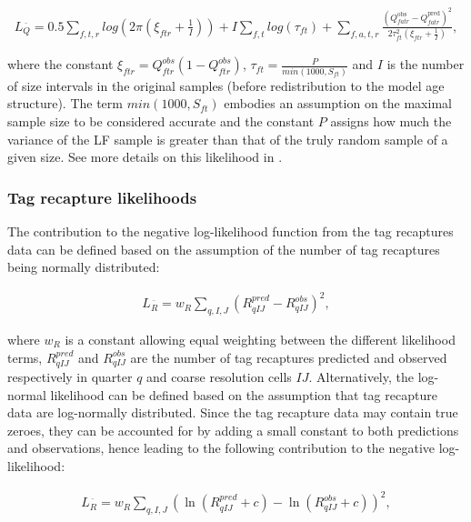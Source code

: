 \begin{align}\label{eq:lf-like2}
L_{\scriptscriptstyle  Q}^{\bar{\text{ }}} = 0.5\sum\limits_{f,t,r} log\left(2 \pi \left(\xi_{ftr}+\frac{1}{I}\right)\right)+		I\sum\limits_{f,t} log(\tau_{ft}) + \sum\limits_{f,a,t,r} \frac{\left(Q^{\text{obs}}_{fatr}-Q^{\text{pred}}_{fatr}\right)^2}{2\tau^2_{ft} \left(\xi_{ftr}+\frac{1}{I}\right)},
\end{align}

\noindent where the constant $\xi_{ftr}=Q^{obs}_{ftr}(1-Q^{obs}_{ftr})$, $\tau_{ft}=\frac{P}{min(1000,S_{ft})}$ and $I$ is the number of size intervals in the original samples (before redistribution to the model age structure). The term $min(1000,S_{ft})$ embodies an assumption on the maximal sample size to be considered accurate and the constant $P$ assigns how much the variance of the LF sample is greater than that of the truly random sample of a given size. See more details on this likelihood in \citet{Hampton-Fournier}.

\subsubsection{Tag recapture likelihoods}\label{sec:tag-like}

The contribution to the negative log-likelihood function from the tag recaptures data can be defined based on the assumption of the number of tag recaptures being normally distributed:

\begin{align}\label{eq:tag-like1}
L_{\scriptscriptstyle  R}^{\bar{\text{ }}} = w_R \sum_{q,I,J}\left(R^{pred}_{qIJ}-R^{obs}_{qIJ}\right)^2,
\end{align} 

\noindent where $w_R$ is a constant allowing equal weighting between the different likelihood terms, $R^{pred}_{qIJ}$ and $R^{obs}_{qIJ}$ are the number of tag recaptures predicted and observed respectively in quarter $q$ and coarse resolution cells $IJ$. Alternatively, the log-normal likelihood can be defined based on the assumption that tag recapture data are log-normally distributed. Since the tag recapture data may contain true zeroes, they can be accounted for by adding a small constant to both predictions and observations, hence leading to the following contribution to the negative log-likelihood:

\begin{align}\label{eq:tag-like2}
L_{\scriptscriptstyle  R}^{\bar{\text{ }}} = w_R \sum_{q,I,J}\left(\ln\left(R^{pred}_{qIJ}+c\right)-\ln\left(R^{obs}_{qIJ}+c\right)\right)^2,
\end{align} 

